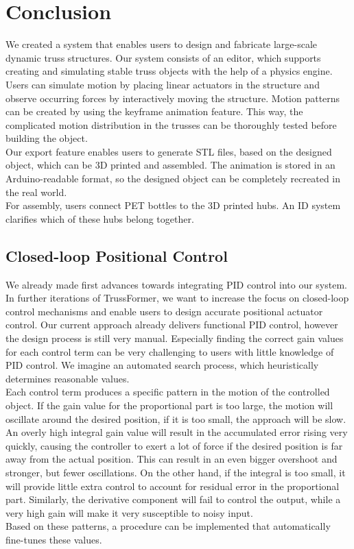 \chapter{Conclusion}\label{ch:conclusion}
We created a system that enables users to design and fabricate large-scale dynamic truss structures. Our system consists of an editor, which supports creating and simulating stable truss objects with the help of a physics engine. Users can simulate motion by placing linear actuators in the structure and observe occurring forces by interactively moving the structure. Motion patterns can be created by using the keyframe animation feature. This way, the complicated motion distribution in the trusses can be thoroughly tested before building the object.\\
Our export feature enables users to generate STL files, based on the designed object, which can be 3D printed and assembled. The animation is stored in an Arduino-readable format, so the designed object can be completely recreated in the real world.\\
For assembly, users connect PET bottles to the 3D printed hubs. An ID system clarifies which of these hubs belong together.

\section{Closed-loop Positional Control}
We already made first advances towards integrating PID control into our system. In further iterations of TrussFormer, we want to increase the focus on closed-loop control mechanisms and enable users to design accurate positional actuator control. Our current approach already delivers functional PID control, however the design process is still very manual. Especially finding the correct gain values for each control term can be very challenging to users with little knowledge of PID control. We imagine an automated search process, which heuristically determines reasonable values.\\
Each control term produces a specific pattern in the motion of the controlled object. If the gain value for the proportional part is too large, the motion will oscillate around the desired position, if it is too small, the approach will be slow. An overly high integral gain value will result in the accumulated error rising very quickly, causing the controller to exert a lot of force if the desired position is far away from the actual position. This can result in an even bigger overshoot and stronger, but fewer oscillations. On the other hand, if the integral is too small, it will provide little extra control to account for residual error in the proportional part. Similarly, the derivative component will fail to control the output, while a very high gain will make it very susceptible to noisy input.\\
Based on these patterns, a procedure can be implemented that automatically fine-tunes these values.
